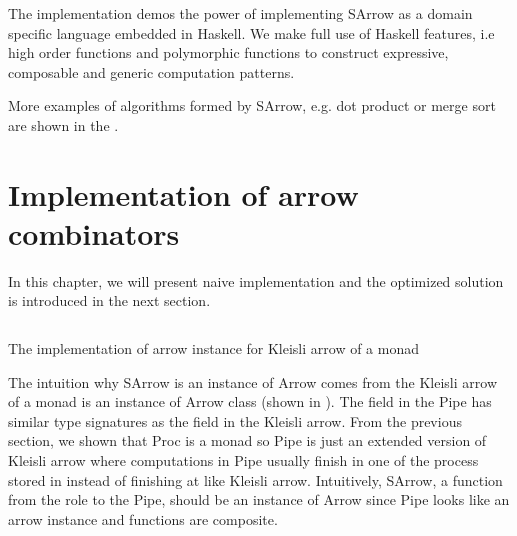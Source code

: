 The implementation demos the power of implementing SArrow as a domain specific language embedded in Haskell. We make full use of Haskell features, i.e high order functions and polymorphic functions to construct expressive, composable and generic computation patterns.

More examples of algorithms formed by SArrow, e.g. dot product or merge sort are shown in the .
\section{Implementation of arrow combinators} \label{SArrow:impl}
In this chapter, we will present naive implementation and the optimized solution is introduced in the next section.

\begin{listing}[ht]
    \inputminted{Haskell}{arrow/kleisli.hs} 
    \caption{The implementation of arrow instance for Kleisli arrow of a monad}
    \label{arrow:code:kleisli}
\end{listing}
The intuition why SArrow is an instance of Arrow comes from the Kleisli arrow of a monad is an instance of Arrow class (shown in ). The  field in the Pipe has similar type signatures as the  field in the Kleisli arrow. From the previous section, we shown that Proc is a monad so Pipe is just an extended version of Kleisli arrow where computations in Pipe usually finish in one of the process stored in  instead of finishing at  like Kleisli arrow. Intuitively, SArrow, a function from the role to the Pipe, should be an instance of Arrow since Pipe looks like an arrow instance and functions are composite.

